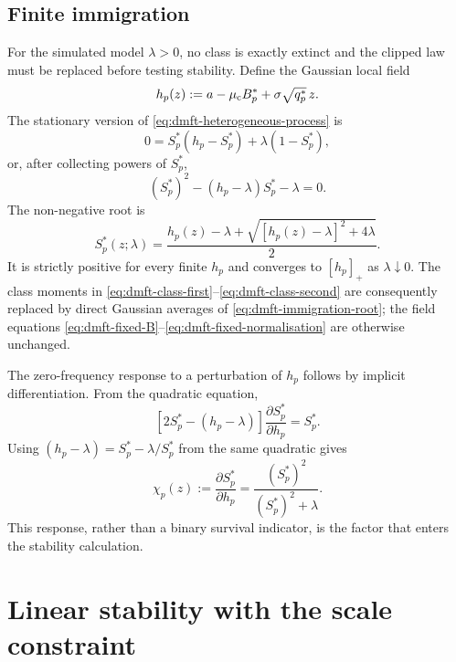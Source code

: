 \subsection{Finite immigration}

For the simulated model $\lambda>0$, no class is exactly extinct and the clipped law must be
replaced before testing stability.  Define the Gaussian local field
\begin{equation}
    h_p(z):=a-\mu_{\rm c}B_p^*+\sigma\sqrt{q_p^*}\,z.
\end{equation}
The stationary version of \eqref{eq:dmft-heterogeneous-process} is
\begin{equation}
    0=S_p^*(h_p-S_p^*)+\lambda(1-S_p^*),
\end{equation}
or, after collecting powers of $S_p^*$,
\begin{equation}
    (S_p^*)^2-(h_p-\lambda)S_p^*-\lambda=0.
\end{equation}
The non-negative root is
\begin{equation}
    S_p^*(z;\lambda)
      =\frac{h_p(z)-\lambda
        +\sqrt{[h_p(z)-\lambda]^2+4\lambda}}{2}.
    \label{eq:dmft-immigration-root}
\end{equation}
It is strictly positive for every finite $h_p$ and converges to $[h_p]_+$ as
$\lambda\downarrow0$.  The class moments in
\eqref{eq:dmft-class-first}--\eqref{eq:dmft-class-second} are consequently replaced by
direct Gaussian averages of \eqref{eq:dmft-immigration-root}; the field equations
\eqref{eq:dmft-fixed-B}--\eqref{eq:dmft-fixed-normalisation} are otherwise unchanged.

The zero-frequency response to a perturbation of $h_p$ follows by implicit differentiation.
From the quadratic equation,
\begin{equation}
    \left[2S_p^*-(h_p-\lambda)\right]\frac{\partial S_p^*}{\partial h_p}=S_p^*.
\end{equation}
Using $(h_p-\lambda)=S_p^*-\lambda/S_p^*$ from the same quadratic gives
\begin{equation}
    \chi_p(z):=\frac{\partial S_p^*}{\partial h_p}
       =\frac{(S_p^*)^2}{(S_p^*)^2+\lambda}.
    \label{eq:dmft-immigration-response}
\end{equation}
This response, rather than a binary survival indicator, is the factor that enters the stability
calculation.

\section{Linear stability with the scale constraint}
\label{sec:dmft-stability}

